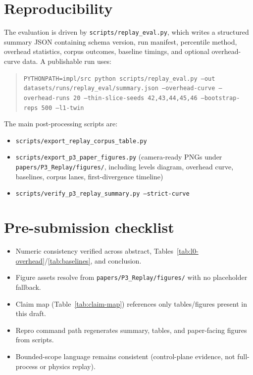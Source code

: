 \documentclass[11pt]{article}
\newcommand{\tool}[1]{\texttt{#1}}
\newcommand{\code}[1]{\texttt{#1}}
\begin{document}
\section{Reproducibility}

The evaluation is driven by \tool{scripts/replay\_eval.py}, which writes a structured summary JSON containing schema version, run manifest, percentile method, overhead statistics, corpus outcomes, baseline timings, and optional overhead-curve data. A publishable run uses:
\begin{quote}
\small
\tool{PYTHONPATH=impl/src python scripts/replay\_eval.py --out datasets/runs/replay\_eval/summary.json --overhead-curve --overhead-runs 20 --thin-slice-seeds 42,43,44,45,46 --bootstrap-reps 500 --l1-twin}
\end{quote}

The main post-processing scripts are:
\begin{itemize}[leftmargin=1.5em]
    \item \tool{scripts/export\_replay\_corpus\_table.py}
    \item \tool{scripts/export\_p3\_paper\_figures.py} (camera-ready PNGs under \code{papers/P3\_Replay/figures/}, including levels diagram, overhead curve, baselines, corpus lanes, first-divergence timeline)
    \item \tool{scripts/verify\_p3\_replay\_summary.py --strict-curve}
\end{itemize}

\section{Pre-submission checklist}
\begin{itemize}[leftmargin=1.5em]
    \item Numeric consistency verified across abstract, Tables~\ref{tab:l0-overhead}/\ref{tab:baselines}, and conclusion.
    \item Figure assets resolve from \code{papers/P3\_Replay/figures/} with no placeholder fallback.
    \item Claim map (Table~\ref{tab:claim-map}) references only tables/figures present in this draft.
    \item Repro command path regenerates summary, tables, and paper-facing figures from scripts.
    \item Bounded-scope language remains consistent (control-plane evidence, not full-process or physics replay).
\end{itemize}
\end{document}
